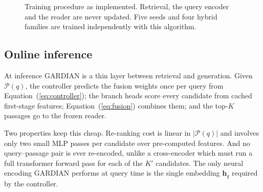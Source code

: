 \begin{figure}[t]
\centering
{}
\caption{Training procedure as implemented. Retrieval, the query encoder and
the reader are never updated. Five seeds and four hybrid families are trained
independently with this algorithm.}
\label{fig:alg-train}
\end{figure}

\subsection{Online inference}
\label{sec:online}

At inference GARDIAN is a thin layer between retrieval and generation. Given
$\mathcal{P}(q)$, the controller predicts the fusion weights once per query
from Equation~(\ref{eq:controller}); the branch heads score every candidate
from cached first-stage features; Equation~(\ref{eq:fusion}) combines them;
and the top-$K$ passages go to the frozen reader.

Two properties keep this cheap. Re-ranking cost is linear in $|\mathcal{P}(q)|$
and involves only two small MLP passes per candidate over pre-computed
features. And no query--passage pair is ever re-encoded, unlike a
cross-encoder which must run a full transformer forward pass for each of the
$K'$ candidates. The only neural encoding GARDIAN performs at query time is
the single embedding $\mathbf{h}_q$ required by the controller.
